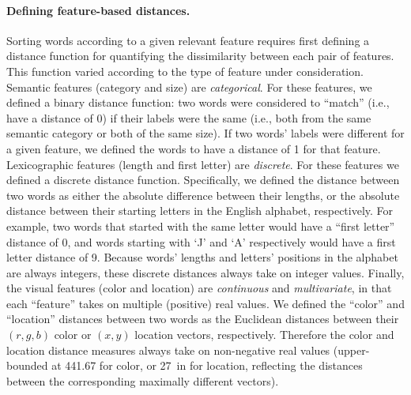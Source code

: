 \documentclass[11pt]{article}
\begin{document}
\paragraph{Defining feature-based distances.} Sorting words according to a
given relevant feature requires first defining a distance function for
quantifying the dissimilarity between each pair of features. This function
varied according to the type of feature under consideration. Semantic features
(category and size) are \textit{categorical}. For these features, we defined a
binary distance function: two words were considered to ``match'' (i.e., have a
distance of 0) if their labels were the same (i.e., both from the same semantic
category or both of the same size). If two words' labels were different for a
given feature, we defined the words to have a distance of 1 for that feature.
Lexicographic features (length and first letter) are \textit{discrete}. For
these features we defined a discrete distance function. Specifically, we
defined the distance between two words as either the absolute difference
between their lengths, or the absolute distance between their starting letters
in the English alphabet, respectively. For example, two words that started with
the same letter would have a ``first letter'' distance of 0, and words starting
with `J' and `A' respectively would have a first letter distance of 9. Because
words' lengths and letters' positions in the alphabet are always integers,
these discrete distances always take on integer values. Finally, the visual
features (color and location) are \textit{continuous} and
\textit{multivariate}, in that each ``feature'' takes on multiple (positive)
real values. We defined the ``color'' and ``location'' distances between two
words as the Euclidean distances between their $(r, g, b)$ color or $(x, y)$
location vectors, respectively. Therefore the color and location distance
measures always take on non-negative real values (upper-bounded at 441.67 for
color, or 27~in for location, reflecting the distances between the
corresponding maximally different vectors).
\end{document}
